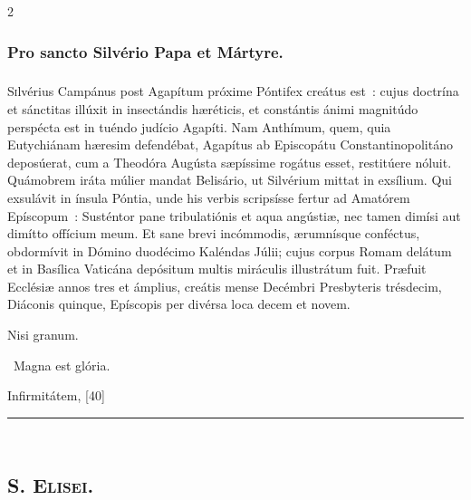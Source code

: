 \documentclass[9pt,twoside]{extarticle}
\begin{document}
\begin{multicols}{2}
{\begin{tightlist}{}
\item {}
\end{tightlist}

\subsubsection*{\center Pro sancto Silvério Papa et Mártyre.}
\subsubsection*{\center {}}
\lettrine{S}ilvérius Campánus post Agapítum próxime Póntifex creátus est~: cujus doctrína et sánctitas illúxit in insectándis hæréticis, et constántis ánimi magnitúdo perspécta est in tuéndo judício Agapíti. Nam Anthímum, quem, quia Eutychiánam hæresim defendébat, Agapítus ab Episcopátu Constantinopolitáno deposúerat, cum a Theodóra Augústa sæpíssime rogátus esset, restitúere nóluit. Quámobrem iráta múlier mandat Belisário, ut Silvérium mittat in exsílium. Qui exsulávit in ínsula Póntia, unde his verbis scripsísse fertur ad Amatórem Epíscopum~: Susténtor pane tribulatiónis et aqua angústiæ, nec tamen dimísi aut dimítto offícium meum. Et sane brevi incómmodis, ærumnísque conféctus, obdormívit in Dómino duodécimo Kaléndas Júlii; cujus corpus Romam delátum et in Basílica Vaticána depósitum multis miráculis illustrátum fuit. Præfuit Ecclésiæ annos tres et ámplius, creátis mense Decémbri Presbyteris trésdecim, Diáconis quinque, Epíscopis per divérsa loca decem et novem.

\begin{tightlist}{}
\item {} Nisi granum.
\item {}~Magna est glória.
\item {} Infirmitátem,  [40]
\end{tightlist}

\begin{center}\textcolor{red}{\rule{\linewidth}{0.5pt}} \end{center}

\subsection*{\center \textsc{\\
S. Elisei.}}
}
\end{multicols}
\end{document}
